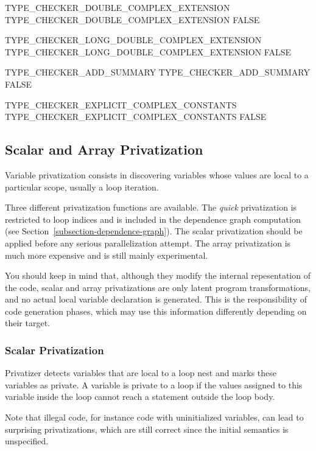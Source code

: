 \documentclass[a4paper]{report}
\newenvironment{PipsPass}[1]{\label{pass:#1}}{}
\begin{document}
\begin{PipsProp}{TYPE_CHECKER_DOUBLE_COMPLEX_EXTENSION}
TYPE_CHECKER_DOUBLE_COMPLEX_EXTENSION FALSE
\end{PipsProp}
\begin{PipsProp}{TYPE_CHECKER_LONG_DOUBLE_COMPLEX_EXTENSION}
TYPE_CHECKER_LONG_DOUBLE_COMPLEX_EXTENSION FALSE
\end{PipsProp}
\begin{PipsProp}{TYPE_CHECKER_ADD_SUMMARY}
TYPE_CHECKER_ADD_SUMMARY FALSE
\end{PipsProp}
\begin{PipsProp}{TYPE_CHECKER_EXPLICIT_COMPLEX_CONSTANTS}
TYPE_CHECKER_EXPLICIT_COMPLEX_CONSTANTS FALSE
\end{PipsProp}


\subsection{Scalar and Array Privatization}
\label{sec:scalar-and-array-privatization}

Variable privatization consists in discovering variables whose values are
local to a particular scope, usually a loop iteration.

Three different privatization functions are available. The {\em quick}
privatization is restricted to loop indices and is included in the
dependence graph computation (see
Section~\ref{subsection-dependence-graph}). The scalar privatization should
be applied before any serious parallelization attempt. The array
privatization is much more expensive and is still mainly experimental.

You should keep in mind that, although they modify the internal
repesentation of the code, scalar and array privatizations are only
latent program transformations, and no actual local variable
declaration is generated. This is the responsibility of code
generation phases, which may use this information differently
depending on their target.


\subsubsection{Scalar Privatization}

\begin{PipsPass}{privatize_module}
Privatizer detects variables that are local to a loop nest and marks
these variables as private. A variable is private to a loop if the
values assigned to this variable inside the loop cannot reach a
statement outside the loop body.

Note that illegal code, for instance code with uninitialized
variables, can lead to surprising privatizations, which are still
correct since the initial semantics is unspecified.
\end{PipsPass}
\end{document}
